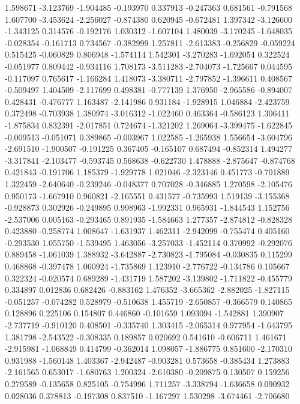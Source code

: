 1.598671
-3.123769
-1.904485
-0.193970
0.337913
-0.247363
0.681561
-0.791568
1.607700
-3.453624
-2.256027
-0.874380
0.620945
-0.672481
1.397342
-3.126600
-1.343125
0.314576
-0.192176
1.030312
-1.607104
1.480039
-3.170245
-1.648035
-0.028354
-0.161713
0.734567
-0.382999
1.257811
-2.613383
-0.256829
-0.059224
0.515425
-0.060829
0.806948
-1.574114
1.542301
-3.270283
-1.692054
0.322524
-0.051977
0.809442
-0.934116
1.708173
-3.511283
-2.704073
-1.725667
0.044595
-0.117097
0.765617
-1.166284
1.418073
-3.380711
-2.797852
-1.396611
0.408567
-0.509497
1.404509
-2.117699
0.498381
-0.777139
1.376950
-2.965586
-0.894007
0.428431
-0.476777
1.163487
-2.141986
0.931184
-1.928915
1.046884
-2.423759
0.372498
-0.703938
1.380974
-3.016312
-1.022460
0.463364
-0.586123
1.306411
-1.875834
0.832391
-2.017851
0.724674
-1.321202
1.269064
-3.399475
-1.622845
-0.009513
-0.051071
0.389865
-0.003967
1.022585
-1.265938
1.556654
-3.604796
-2.691510
-1.900507
-0.191225
0.367405
-0.165107
0.687494
-0.852314
1.494277
-3.317841
-2.103477
-0.593745
0.568638
-0.622730
1.478888
-2.875647
-0.874768
0.421843
-0.191706
1.185379
-1.929778
1.021046
-2.323146
0.451773
-0.701889
1.322459
-2.640640
-0.239246
-0.048377
0.707028
-0.346885
1.270598
-2.105476
0.950173
-1.667910
0.960821
-2.165551
0.431577
-0.735993
1.519139
-3.155368
-0.928873
0.302926
-0.249895
0.998963
-1.992331
0.965931
-1.844543
1.152756
-2.537006
0.005163
-0.293465
0.891935
-1.584663
1.277357
-2.874812
-0.828328
0.423880
-0.258774
1.008647
-1.631937
1.462311
-2.942099
-0.755474
0.405160
-0.293530
1.055750
-1.539495
1.463056
-3.257033
-1.452114
0.370992
-0.292076
0.889458
-1.061039
1.388932
-3.642887
-2.730823
-1.795084
-0.030835
0.115299
0.468868
-0.397478
1.060924
-1.735869
1.123910
-2.776722
-0.134786
0.105667
0.322324
-0.020574
0.689289
-1.431719
1.587202
-3.139802
-1.711822
-0.455779
0.334897
0.012836
0.682426
-0.883162
1.476352
-3.665362
-2.882025
-1.827115
-0.051257
-0.074282
0.528979
-0.510638
1.455719
-2.650857
-0.366579
0.140865
0.128896
0.225106
0.154807
0.446860
-0.101659
1.093094
-1.542881
1.390907
-2.737719
-0.910120
0.408501
-0.335740
1.303415
-2.065314
0.977954
-1.643795
1.381798
-2.543522
-0.308335
0.189857
0.020692
0.541610
-0.606711
1.461671
-2.915981
-1.068849
0.414799
-0.362014
1.098057
-1.886775
0.851600
-2.170310
0.931988
-1.560148
1.403367
-2.942487
-0.903281
0.573658
-0.385434
1.273883
-2.161565
0.653017
-1.680763
1.200324
-2.610380
-0.209875
0.130507
0.159256
0.279589
-0.135658
0.825105
-0.754996
1.711257
-3.338794
-1.636658
0.090932
0.028036
0.378813
-0.197308
0.837510
-1.167297
1.530298
-3.674461
-2.706680
